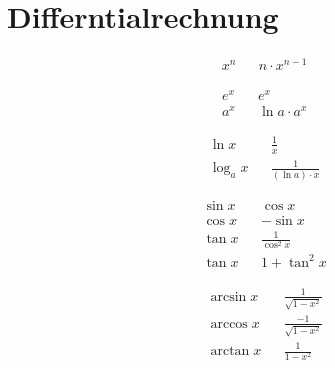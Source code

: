 \section{Differntialrechnung}

\begin{boxleft}
\end{boxleft}\begin{boxrightshaded}
 \begin{align}
  &x^n& 	&n\cdot x^{n-1}
 \end{align}
\end{boxrightshaded}

\begin{boxleft}
\end{boxleft}\begin{boxrightshaded} \begin{align}
  &e^x& 	&e^x\\
  &a^x& 	&\ln a\cdot a^x
 \end{align}
\end{boxrightshaded}

\begin{boxleft}
\end{boxleft}\begin{boxrightshaded}
 \begin{align} 
  &\ln x& &\frac{1}{x}\\
  &\log_a x&	&\frac{1}{(\ln a)\cdot x}
 \end{align}
\end{boxrightshaded}

\begin{boxleft}
\end{boxleft}\begin{boxrightshaded}
 \begin{align} 
  &\sin x& 	&\cos x \\
  &\cos x& 	&-\sin x\\
  &\tan x&	&\frac{1}{\cos^2 x}\\
  &\tan x&	&1+\tan^2 x
\end{align}\end{boxrightshaded}
 
\begin{boxleft}
\end{boxleft}\begin{boxrightshaded}
 \begin{align} 
  &\arcsin x& &\frac{1}{\sqrt{1-x^2}}\\
  &\arccos x& &\frac{-1}{\sqrt{1-x^2}}\\
  &\arctan x& &\frac{1}{1-x^2}
\end{align}\end{boxrightshaded}

